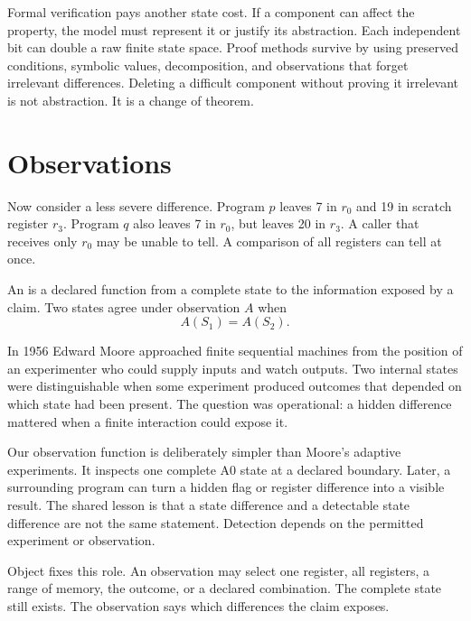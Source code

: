 Formal verification pays another state cost. If a component can affect the
property, the model must represent it or justify its abstraction. Each
independent bit can double a raw finite state space. Proof methods survive by
using preserved conditions, symbolic values, decomposition, and observations that forget
irrelevant differences. Deleting a difficult component without proving it
irrelevant is not abstraction. It is a change of theorem.

\section{Observations}
\label{sec:state-observation}

Now consider a less severe difference. Program \(p\) leaves 7 in \(r_0\) and
19 in scratch register \(r_3\). Program \(q\) also leaves 7 in \(r_0\), but
leaves 20 in \(r_3\). A caller that receives only \(r_0\) may be unable to
tell. A comparison of all registers can tell at once.

\begin{definition}[title={Observation}]
An  is a declared function from a complete state to the
information exposed by a claim. Two states agree under observation \(A\) when
\[
  A(S_1)=A(S_2).
\]
\end{definition}

In 1956 Edward Moore approached finite sequential machines from the position
of an experimenter who could supply inputs and watch outputs. Two internal
states were distinguishable when some experiment produced outcomes that
depended on which state had been present. The question was operational: a
hidden difference mattered when a finite interaction could expose
it.\autocite{moore1956gedanken}

Our observation function is deliberately simpler than Moore's adaptive
experiments. It inspects one complete A0 state at a declared boundary. Later,
a surrounding program can turn a hidden flag or register difference into a
visible result. The shared lesson is that a state difference and a detectable
state difference are not the same statement. Detection depends on the
permitted experiment or observation.

Object  fixes this role. An observation may select one
register, all registers, a range of memory, the outcome, or a declared
combination. The complete state still exists. The observation says which
differences the claim exposes.

